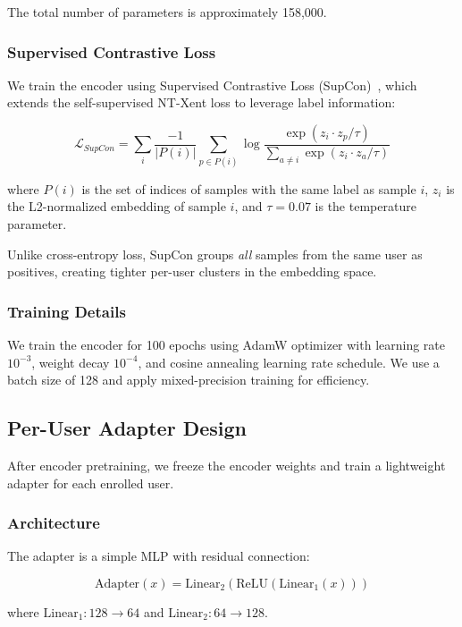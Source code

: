 \documentclass{ieeeaccess}
\begin{document}
{The total number of parameters is approximately 158,000.

\subsubsection{Supervised Contrastive Loss}
We train the encoder using Supervised Contrastive Loss (SupCon)~\cite{b10}, which extends the self-supervised NT-Xent loss to leverage label information:

\begin{equation}
\mathcal{L}_{SupCon} = \sum_{i} \frac{-1}{|P(i)|} \sum_{p \in P(i)} \log \frac{\exp(z_i \cdot z_p / \tau)}{\sum_{a \neq i} \exp(z_i \cdot z_a / \tau)}
\label{eq:supcon}
\end{equation}

where $P(i)$ is the set of indices of samples with the same label as sample $i$, $z_i$ is the L2-normalized embedding of sample $i$, and $\tau = 0.07$ is the temperature parameter.

Unlike cross-entropy loss, SupCon groups \textit{all} samples from the same user as positives, creating tighter per-user clusters in the embedding space.

\subsubsection{Training Details}
We train the encoder for 100 epochs using AdamW optimizer with learning rate $10^{-3}$, weight decay $10^{-4}$, and cosine annealing learning rate schedule. We use a batch size of 128 and apply mixed-precision training for efficiency.

\subsection{Per-User Adapter Design}
After encoder pretraining, we freeze the encoder weights and train a lightweight adapter for each enrolled user.

\subsubsection{Architecture}
The adapter is a simple MLP with residual connection:

\begin{equation}
\text{Adapter}(x) = \text{Linear}_2(\text{ReLU}(\text{Linear}_1(x)))
\label{eq:adapter}
\end{equation}

where $\text{Linear}_1: 128 \rightarrow 64$ and $\text{Linear}_2: 64 \rightarrow 128$.

}
\end{document}
